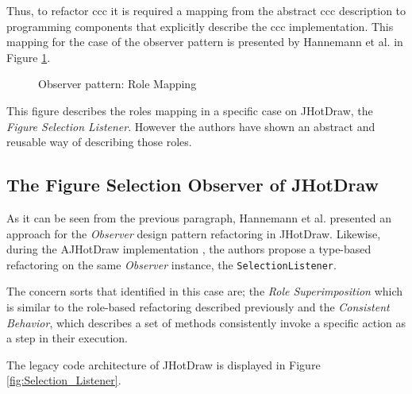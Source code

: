 Thus, to refactor \ac{ccc} it is required a mapping from the abstract \ac{ccc} description to programming components that explicitly describe the \ac{ccc} implementation.
This mapping for the case of the observer pattern is presented by Hannemann et al. \cite{hannemann2005role} in Figure \ref{fig:Observer_Role_Mapping}.

\begin{figure}[H]
	\centering
  	\caption{Observer pattern: Role Mapping \cite{hannemann2005role}}
  	\label{fig:Observer_Role_Mapping}
\end{figure}

This figure describes the roles mapping in a specific case on JHotDraw, the \textit{Figure Selection Listener}.
However the authors have shown an abstract and reusable way of describing those roles.

\subsection{The Figure Selection Observer of JHotDraw}\label{The Figure Selection Observer of JHotDraw}
As it can be seen from the previous paragraph, Hannemann et al. \cite{hannemann2005role} presented an approach for the \textit{Observer} design pattern refactoring in JHotDraw.
Likewise, during the AJHotDraw implementation\cite{marin2005approach} \cite{hannemann2005role}, the authors propose a type-based refactoring on the same \textit{Observer} instance, the \texttt{SelectionListener}.

The concern sorts that identified in this case are; the \textit{Role Superimposition} which is similar to the role-based refactoring described previously and the \textit{Consistent Behavior}, which describes a set of methods consistently invoke a specific action as a step in their execution.

The legacy code architecture of JHotDraw is displayed in Figure \ref{fig:Selection_Listener}.


